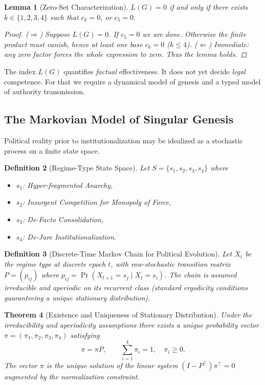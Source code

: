 \documentclass[11pt,a4paper]{article}
\newtheorem{theorem}{Theorem}[section]
\newtheorem{lemma}[theorem]{Lemma}
\newtheorem{definition}[theorem]{Definition}
\begin{document}
\begin{lemma}[Zero-Set Characterization]
\(L(G) = 0\) if and only if there exists \(k \in \{1,2,3,4\}\) such that \(c_k = 0\), or \(c_5 = 0\).

\begin{proof}
(\(\Rightarrow\)) Suppose \(L(G) = 0\). If \(c_5 = 0\) we are done. Otherwise the finite product must vanish, hence at least one base \(c_k = 0\) (\(k \le 4\)).  
(\(\Leftarrow\)) Immediate: any zero factor forces the whole expression to zero.  
Thus the lemma holds.
\end{proof}
\end{lemma}

The index \(L(G)\) quantifies \emph{factual} effectiveness. It does not yet decide \emph{legal} competence. For that we require a dynamical model of genesis and a typed model of authority transmission.

\subsection{The Markovian Model of Singular Genesis}

Political reality prior to institutionalization may be idealized as a stochastic process on a finite state space.

\begin{definition}[Regime-Type State Space]
Let \(S = \{s_1, s_2, s_3, s_4\}\) where
\begin{itemize}
\item \(s_1\): Hyper-fragmented Anarchy,
\item \(s_2\): Insurgent Competition for Monopoly of Force,
\item \(s_3\): De-Facto Consolidation,
\item \(s_4\): De-Jure Institutionalization.
\end{itemize}
\end{definition}

\begin{definition}[Discrete-Time Markov Chain for Political Evolution]
Let \(X_t\) be the regime type at discrete epoch \(t\), with row-stochastic transition matrix \(P = (p_{ij})\) where \(p_{ij} = \Pr(X_{t+1}=s_j \mid X_t = s_i)\). The chain is assumed irreducible and aperiodic on its recurrent class (standard ergodicity conditions guaranteeing a unique stationary distribution).
\end{definition}

\begin{theorem}[Existence and Uniqueness of Stationary Distribution]
Under the irreducibility and aperiodicity assumptions there exists a unique probability vector \(\pi = (\pi_1, \pi_2, \pi_3, \pi_4)\) satisfying
\[
\pi = \pi P, \qquad \sum_{i=1}^4 \pi_i = 1, \quad \pi_i \ge 0.
\]
The vector \(\pi\) is the unique solution of the linear system \((I - P^\top)\pi^\top = 0\) augmented by the normalization constraint.
\end{theorem}
\end{document}

